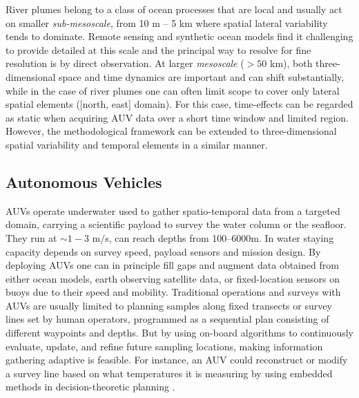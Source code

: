 \documentclass[aoas]{imsart}
\begin{document}


River plumes belong to a class of ocean processes that are local and
usually act on smaller \emph{sub-mesoscale}, from 10 m -- 5 km where
spatial lateral variability tends to dominate. Remote sensing and
synthetic ocean models find it challenging to provide detailed at this
scale \citep{Lermusiaux:2006} and the principal way to resolve for fine
resolution is by direct observation. At larger \emph{mesoscale} ($>50$
km), both three-dimensional space and time dynamics are important and
can shift substantially, while in the case of river plumes one can often
limit scope to cover only lateral spatial elements ([north, east]
domain). For this case, time-effects can be regarded as static when
acquiring AUV data over a short time window and limited region. However,
the methodological framework can be extended to three-dimensional
spatial variability and temporal elements in a similar manner.

\subsection{Autonomous Vehicles}

AUVs operate underwater used to gather spatio-temporal data from a
targeted domain, carrying a scientific payload to survey the water
column or the seafloor. They run at $\sim 1-3$ m/s, can reach depths
from 100--6000m. In water staying capacity depends on survey speed,
payload sensors and mission design. By deploying AUVs one can in
principle fill gaps and augment data obtained from either ocean models,
earth observing satellite data, or fixed-location sensors on buoys due
to their speed and mobility. Traditional operations and surveys with
AUVs are usually limited to planning samples along fixed transects or
survey lines set by human operators, programmed as a sequential plan
consisting of different waypoints and depths. But by using on-board
algorithms to continuously evaluate, update, and refine future sampling
locations, making information gathering adaptive \citep{das11b} is
feasible. For instance, an AUV could reconstruct or modify a survey line
based on what temperatures it is measuring by using embedded methods in
decision-theoretic planning \citep{ryan10}.
\end{document}
